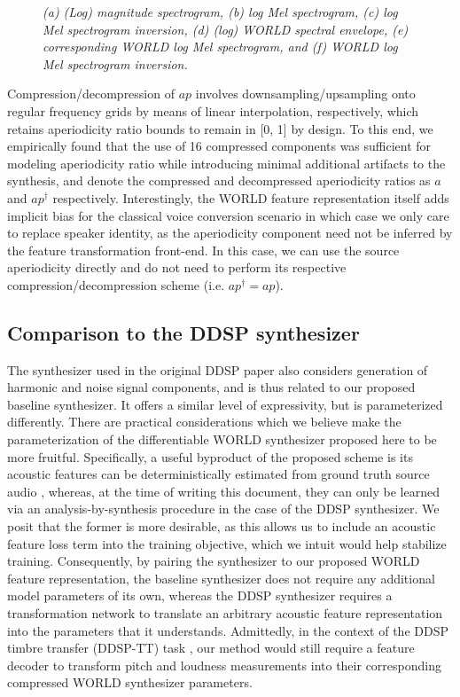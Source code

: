 \documentclass{article}
\begin{document}
\begin{sloppy}
\begin{figure}[ht]
\caption{\it (a) (Log) magnitude spectrogram, (b) log Mel spectrogram, (c) log Mel spectrogram inversion, (d) (log) WORLD spectral envelope, (e) corresponding WORLD log Mel spectrogram,  and (f) WORLD log Mel spectrogram inversion.}
\label{fig:spec}
\end{figure}

Compression/decompression of $ap$ involves downsampling/upsampling onto regular frequency grids by means of linear interpolation, respectively, which retains aperiodicity ratio bounds to remain in [0, 1] by design.  To this end, we empirically found that the use of 16 compressed components was sufficient for modeling aperiodicity ratio while introducing minimal additional artifacts to the synthesis, and denote the compressed and decompressed aperiodicity ratios as $a$ and $ap^\dagger$ respectively.  Interestingly, the WORLD feature representation itself adds implicit bias for the classical voice conversion scenario in which case we only care to replace speaker identity, as the aperiodicity component need not be inferred by the feature transformation front-end.  In this case, we can use the source aperiodicity directly and do not need to perform its respective compression/decompression scheme (i.e. $ap^\dagger=ap$).

\subsection{Comparison to the DDSP synthesizer}
\label{ssec:hns}
The synthesizer used in the original DDSP paper \cite{Ddsp} also considers generation of harmonic and noise signal components, and is thus related to our proposed baseline synthesizer.  It offers a similar level of expressivity, but is parameterized differently.  There are practical considerations which we believe make the parameterization of the differentiable WORLD synthesizer proposed here to be more fruitful.  Specifically, a useful byproduct of the proposed scheme is its acoustic features can be deterministically estimated from ground truth source audio \cite{WORLD}, whereas, at the time of writing this document, they can only be learned via an analysis-by-synthesis procedure in the case of the DDSP synthesizer.  We posit that the former is more desirable, as this allows us to include an acoustic feature loss term into the training objective, which we intuit would help stabilize training.  Consequently, by pairing the synthesizer to our proposed WORLD feature representation, the baseline synthesizer does not require any additional model parameters of its own, whereas the DDSP synthesizer requires a transformation network to translate an arbitrary acoustic feature representation into the parameters that it understands.  Admittedly, in the context of the DDSP timbre transfer (DDSP-TT) task \cite{Ddsp}, our method would still require a feature decoder to transform pitch and loudness measurements into their corresponding compressed WORLD synthesizer parameters.


\end{sloppy}
\end{document}
